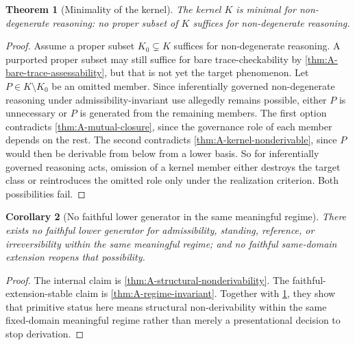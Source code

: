 \documentclass[11pt]{article}
\theoremstyle{plain}
\newtheorem{theorem}{Theorem}[section]
\newtheorem{corollary}[theorem]{Corollary}
\theoremstyle{definition}
\begin{document}
\begin{theorem}[Minimality of the kernel]
\label{thm:A-minimality}
The kernel $K$ is minimal for non-degenerate reasoning: no proper subset of $K$ suffices for non-degenerate reasoning.
\end{theorem}

\begin{proof}
Assume a proper subset $K_0\subsetneq K$ suffices for non-degenerate reasoning. A purported proper subset may still suffice for bare trace-checkability by \cref{thm:A-bare-trace-assessability}, but that is not yet the target phenomenon. Let $P\in K\setminus K_0$ be an omitted member. Since inferentially governed non-degenerate reasoning under admissibility-invariant use allegedly remains possible, either $P$ is unnecessary or $P$ is generated from the remaining members. The first option contradicts \cref{thm:A-mutual-closure}, since the governance role of each member depends on the rest. The second contradicts \cref{thm:A-kernel-nonderivable}, since $P$ would then be derivable from below from a lower basis. So for inferentially governed reasoning acts, omission of a kernel member either destroys the target class or reintroduces the omitted role only under the realization criterion. Both possibilities fail.
\end{proof}

\begin{corollary}[No faithful lower generator in the same meaningful regime]
\label{cor:A-no-lower-generator}
There exists no faithful lower generator for admissibility, standing, reference, or irreversibility within the same meaningful regime; and no faithful same-domain extension reopens that possibility.
\end{corollary}

\begin{proof}
The internal claim is \cref{thm:A-structural-nonderivability}. The faithful-extension-stable claim is \cref{thm:A-regime-invariant}. Together with \cref{thm:A-minimality}, they show that primitive status here means structural non-derivability within the same fixed-domain meaningful regime rather than merely a presentational decision to stop derivation.
\end{proof}
\end{document}
